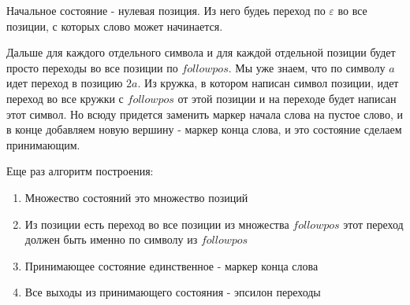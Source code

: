 \begin{multicols}{2}
Начальное состояние - нулевая позиция. Из него будеь переход по $\varepsilon$ во все позиции, с которых слово может начинается.

Дальше для каждого отдельного символа и для каждой отдельной позиции будет просто переходы во все позиции по $followpos$. Мы уже знаем, что по символу $a$ идет переход в позицию $2a$. Из кружка, в котором написан символ позиции, идет переход во все кружки с $followpos$ от этой позиции и на переходе будет написан этот символ. Но всюду придется заменить маркер начала слова на пустое слово, и в конце добавляем новую вершину - маркер конца слова, и это состояние сделаем принимающим.

Еще раз алгоритм построения:
\begin{enumerate}
    \item Множество состояний это множество позиций
    \item Из позиции есть переход во все позиции из множества $followpos$ этот переход должен быть именно по символу из $followpos$
    \item Принимающее состояние единственное - маркер конца слова
    \item Все выходы из принимающего состояния - эпсилон переходы
\end{enumerate}


\begin{center}
\end{center}
\end{multicols}
